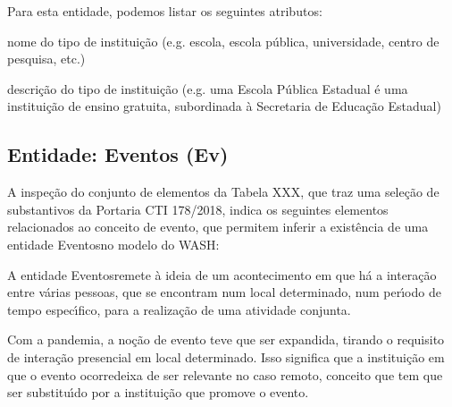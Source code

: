 \documentclass[
12pt,		%
openright,	%
twoside,  %
a4paper,			%
chapter=TITLE,		%
english,			%
french,				%
spanish,			%
brazil				%
]{USPSC-classe/USPSC}
\begin{document}
Para esta entidade, podemos listar os seguintes atributos:





\begin{alineas}
\item nome do tipo de institui\c{c}\~ao (e.g. escola, escola p\'ublica, universidade, centro de pesquisa, etc.)
\item descri\c{c}\~ao do tipo de institui\c{c}\~ao (e.g. \textquotedbl uma Escola P\'ublica Estadual \'e uma institui\c{c}\~ao de ensino gratuita, subordinada \`a Secretaria de Educa\c{c}\~ao Estadual\textquotedbl )
\end{alineas}

\subsection[Entidade: Eventos (Ev)]{Entidade: Eventos (Ev)}\label{Entidade: Eventos (Ev)}
A inspe\c{c}\~ao do conjunto de elementos da Tabela XXX, que traz uma sele\c{c}\~ao de substantivos da Portaria CTI 178/2018, indica os seguintes elementos relacionados ao conceito de \textquotedbl evento\textquotedbl , que permitem inferir a exist\^encia de uma entidade \textquotedbl Eventos\textquotedbl  no modelo do WASH:





\noindent\begin{center}\mbox{\centering{}}\end{center}


A entidade \textquotedbl Eventos\textquotedbl  remete \`a ideia de um acontecimento em que h\'a a intera\c{c}\~ao entre v\'arias pessoas, que se encontram num local determinado, num per\'{\i}odo de tempo espec\'{\i}fico, para a realiza\c{c}\~ao de uma atividade conjunta.




Com a pandemia, a no\c{c}\~ao de evento teve que ser expandida, tirando o requisito de intera\c{c}\~ao presencial em local determinado. Isso significa que \textquotedbl a institui\c{c}\~ao em que o evento ocorre\textquotedbl  deixa de ser relevante no caso remoto, conceito que tem que ser substitu\'{\i}do por \textquotedbl a institui\c{c}\~ao que promove o evento\textquotedbl .
\end{document}
